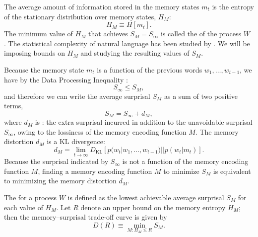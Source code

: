 The average amount of information stored in the memory states $m_t$ is the entropy of the stationary distribution over memory states, $H_M$:
\begin{equation}
    \label{eq:memory-entropy}
    H_M \equiv H[m_t].
\end{equation}
The minimum value of $H_M$ that achieves $S_M = S_\infty$ is called the  of the process $W$ \citep{feldman-measures-1998}. The statistical complexity of natural language has been studied by \citet{hahn2019neural}. We will be imposing bounds on $H_M$ and studying the resulting values of $S_M$. 

Because the memory state $m_t$ is a function of the previous words $w_1, \dots, w_{t-1}$, we have by the Data Processing Inequality \citep[][pp. 34--35]{cover2006elements}:
\begin{equation}
    S_\infty \le S_M,
\end{equation}
and therefore we can write the average surprisal $S_M$ as a sum of two positive terms,
\begin{equation}
    S_M = S_\infty + d_M,
\end{equation}
where $d_M$ is : the extra surprisal incurred in addition to the unavoidable surprisal $S_\infty$, owing to the lossiness of the memory encoding function $M$. 
The memory distortion $d_M$ is a KL divergence:
\begin{equation}
    \label{eq:memory-distortion}
    d_M = \lim_{t \rightarrow \infty} D_{\text{KL}} [ p(w_t | w_1, \dots, w_{t-1}) || p(w_t | m_t)].
\end{equation}
Because the surprisal indicated by $S_\infty$ is not a function of the memory encoding function $M$, finding a memory encoding function $M$ to minimize $S_M$ is equivalent to minimizing the memory distortion $d_M$.

\begin{definition}
The  for a process $W$ is defined as the lowest achievable average surprisal $S_M$ for each value of $H_M$. Let $R$ denote an upper bound on the memory entropy $H_M$; then the memory--surprisal trade-off curve is given by
\begin{equation}
    \label{eq:ms-formal}
    D(R) \equiv \min_{M : H_M \le R} S_M.
\end{equation}
\end{definition}

